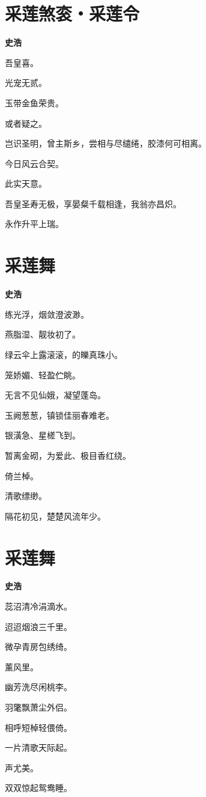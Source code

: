 \documentclass[12pt,a4paper]{ctexbook}
\begin{document}
\section{采莲煞衮・采莲令}
\textbf{史浩}\par\vspace{0.5em}
吾皇喜。\par
光宠无贰。\par
玉带金鱼荣贵。\par
或者疑之。\par
岂识圣明，曾主斯乡，尝相与尽缱绻，胶漆何可相离。\par
今日风云合契。\par
此实天意。\par
吾皇圣寿无极，享晏粲千载相逢，我翁亦昌炽。\par
永作升平上瑞。\par

\section{采莲舞}
\textbf{史浩}\par\vspace{0.5em}
练光浮，烟敛澄波渺。\par
燕脂湿、靓妆初了。\par
绿云伞上露滚滚，的皪真珠小。\par
笼娇媚、轻盈伫眺。\par
无言不见仙娥，凝望蓬岛。\par
玉阙葱葱，镇锁佳丽春难老。\par
银潢急、星槎飞到。\par
暂离金砌，为爱此、极目香红绕。\par
倚兰棹。\par
清歌缥缈。\par
隔花初见，楚楚风流年少。\par

\section{采莲舞}
\textbf{史浩}\par\vspace{0.5em}
蕊沼清冷涓滴水。\par
迢迢烟浪三千里。\par
微孕青房包绣绮。\par
薰风里。\par
幽芳洗尽闲桃李。\par
羽氅飘萧尘外侣。\par
相呼短棹轻偎倚。\par
一片清歌天际起。\par
声尤美。\par
双双惊起鸳鸯睡。\par
\end{document}
